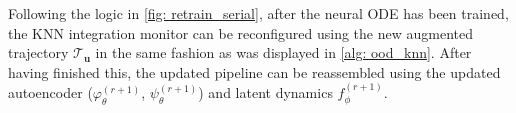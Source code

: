 Following the logic in \autoref{fig: retrain_serial}, after the neural ODE has been trained, the KNN integration monitor can be reconfigured using the new augmented trajectory $\boldsymbol{\mathcal{T}_u}$ in the same fashion as was displayed in \ref{alg: ood_knn}. After having finished this, the updated pipeline can be reassembled using the updated autoencoder ($\varphi_\theta^{(r+1)}$, $\psi_\theta^{(r+1)}$) and latent dynamics $f_\phi^{(r+1)}$. 


